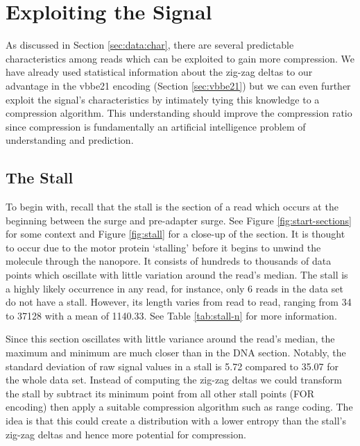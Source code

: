 \section{Exploiting the Signal}

As discussed in Section
\ref{sec:data:char},
there are several predictable characteristics among reads which can be exploited
to gain more compression.
We have already used statistical information about the zig-zag deltas to our
advantage in the vbbe21 encoding (Section \ref{sec:vbbe21}) but we can even
further exploit the signal's characteristics by intimately tying this knowledge
to a compression algorithm. This understanding should improve the compression
ratio since compression is fundamentally an artificial intelligence problem of
understanding and prediction.

\subsection{The Stall}



To begin with, recall that the stall is the section of a read which occurs at
the beginning between the surge and pre-adapter surge. See Figure
\ref{fig:start-sections} for some context and Figure \ref{fig:stall} for a
close-up of the section. It is thought to occur due to the motor protein `stalling'
before it begins to unwind the molecule through the nanopore. It consists of
hundreds to thousands of data points which oscillate with little variation
around the read's median. The stall is a highly likely occurrence in any read,
for instance, only 6 reads in the data set do not have a stall.
However, its length varies from read to read, ranging from 34 to \num{37128}
with a mean of 1140.33. See Table \ref{tab:stall-n} for more information.



Since this section oscillates with little variance around the read's median,
the maximum and minimum are much closer than in the DNA section.
Notably, the standard deviation of raw signal values in a stall is 5.72 compared
to 35.07 for the whole data set.
Instead of computing the zig-zag deltas we could transform the stall by subtract
its minimum point from all other stall points (FOR encoding) then
apply a suitable compression algorithm such as range coding. The idea is that
this could create a distribution with a lower entropy than the stall's zig-zag
deltas and hence more potential for compression.

